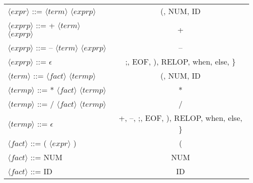 \documentclass[12pt]{article}
\begin{document}
\begin{table}[]
\begin{tabular}{|l|c|}
    $\langle expr \rangle$ ::= $\langle term \rangle$ $\langle exprp \rangle$          & (, NUM, ID                             \\
    $\langle exprp \rangle$ ::= + $\langle term \rangle$ $\langle exprp \rangle$       & +                                      \\
    $\langle exprp \rangle$ ::= – $\langle term \rangle$ $\langle exprp \rangle$       & –                                      \\
    $\langle exprp \rangle$ ::= $\epsilon$            & ;, EOF, ), RELOP, when, else, \}       \\
    $\langle term \rangle$ ::= $\langle fact \rangle$ $\langle termp \rangle$          & (, NUM, ID                             \\
    $\langle termp \rangle$ ::= * $\langle fact \rangle$ $\langle termp \rangle$       & *                                      \\
    $\langle termp \rangle$ ::= / $\langle fact \rangle$ $\langle termp \rangle$       & /                                      \\
    $\langle termp \rangle$ ::= $\epsilon$            & +, –, ;, EOF, ), RELOP, when, else, \} \\
    $\langle fact \rangle$ ::= ( $\langle expr \rangle$ )         & (                                      \\
    $\langle fact \rangle$ ::= NUM           & NUM                                    \\
    $\langle fact \rangle$ ::= ID            & ID                                    
    \end{tabular}
    \end{table}
\end{document}

